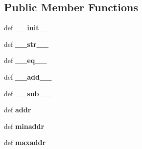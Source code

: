 \subsection*{Public Member Functions}
\begin{DoxyCompactItemize}
\item 
\hypertarget{classcore_1_1misc_1_1ipaddr_1_1_i_p_prefix_a3e3ea1edd22583371efbcd1d04c5edae}{def {\bfseries \+\_\+\+\_\+init\+\_\+\+\_\+}}\label{classcore_1_1misc_1_1ipaddr_1_1_i_p_prefix_a3e3ea1edd22583371efbcd1d04c5edae}

\item 
\hypertarget{classcore_1_1misc_1_1ipaddr_1_1_i_p_prefix_ab4d42adab356f41833713270f761d129}{def {\bfseries \+\_\+\+\_\+str\+\_\+\+\_\+}}\label{classcore_1_1misc_1_1ipaddr_1_1_i_p_prefix_ab4d42adab356f41833713270f761d129}

\item 
\hypertarget{classcore_1_1misc_1_1ipaddr_1_1_i_p_prefix_ac20f6ccb19cdf7bc72dc785074003c86}{def {\bfseries \+\_\+\+\_\+eq\+\_\+\+\_\+}}\label{classcore_1_1misc_1_1ipaddr_1_1_i_p_prefix_ac20f6ccb19cdf7bc72dc785074003c86}

\item 
\hypertarget{classcore_1_1misc_1_1ipaddr_1_1_i_p_prefix_a558c3c6caeec065bdefaf40f081fd23b}{def {\bfseries \+\_\+\+\_\+add\+\_\+\+\_\+}}\label{classcore_1_1misc_1_1ipaddr_1_1_i_p_prefix_a558c3c6caeec065bdefaf40f081fd23b}

\item 
\hypertarget{classcore_1_1misc_1_1ipaddr_1_1_i_p_prefix_a248297adbf4edd6fd35de7c600f08548}{def {\bfseries \+\_\+\+\_\+sub\+\_\+\+\_\+}}\label{classcore_1_1misc_1_1ipaddr_1_1_i_p_prefix_a248297adbf4edd6fd35de7c600f08548}

\item 
\hypertarget{classcore_1_1misc_1_1ipaddr_1_1_i_p_prefix_aeda8759ed5c1934f4e004b08c8a7c131}{def {\bfseries addr}}\label{classcore_1_1misc_1_1ipaddr_1_1_i_p_prefix_aeda8759ed5c1934f4e004b08c8a7c131}

\item 
\hypertarget{classcore_1_1misc_1_1ipaddr_1_1_i_p_prefix_acec391703c0ce0b5f52802aa2775f2bc}{def {\bfseries minaddr}}\label{classcore_1_1misc_1_1ipaddr_1_1_i_p_prefix_acec391703c0ce0b5f52802aa2775f2bc}

\item 
\hypertarget{classcore_1_1misc_1_1ipaddr_1_1_i_p_prefix_a4fe03b8f0f24ff3ac3934fe165251d74}{def {\bfseries maxaddr}}\label{classcore_1_1misc_1_1ipaddr_1_1_i_p_prefix_a4fe03b8f0f24ff3ac3934fe165251d74}


\end{DoxyCompactItemize}
